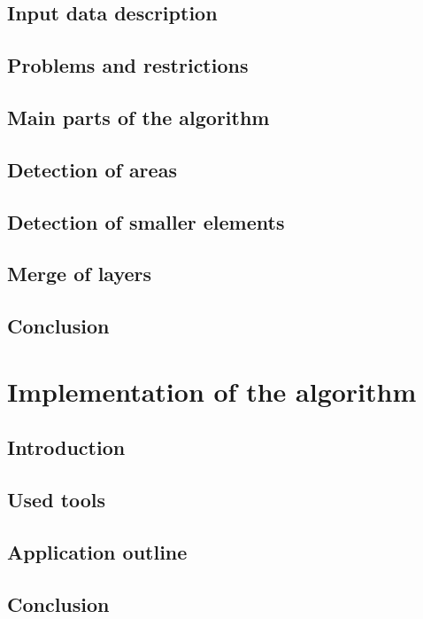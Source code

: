\documentclass[a4paper,onecolumn,oneside,12pt]{memoir}
\begin{document}
\section{Input data description}

\section{Problems and restrictions}

\section{Main parts of the algorithm}

\section{Detection of areas}

\section{Detection of smaller elements}

\section{Merge of layers}

\section{Conclusion}


\chapter{Implementation of the algorithm}

\section{Introduction}

\section{Used tools}

\section{Application outline}

\section{Conclusion}
\end{document}
